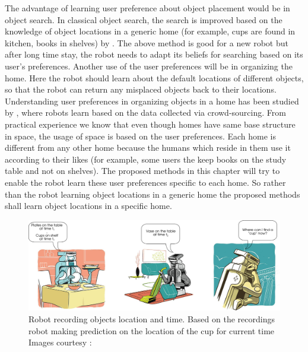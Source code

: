 The advantage of learning user preference about object placement would be in object search. In classical object search, the search is improved based on the knowledge of object locations in a generic home  (for example, cups are found in kitchen, books in shelves) by \cite{samadi_using_2012, joho_learning_2011}. The above method is good for a new robot but after long time stay, the robot needs to adapt its beliefs for searching based on its user's preferences. Another use of the user preferences will be in organizing the home. Here the robot should learn  about the default locations of different objects, so that the robot can return any misplaced objects back to their locations. Understanding user preferences in organizing objects in a home has 
been studied by  \cite{abdo2015robot}, where robots learn based on the data collected via crowd-sourcing.  From practical experience we know that even though homes have same base structure in space, the usage of space is based on the user preferences. Each home is different from any other home because the humans which reside in them use it according to their likes  (for example, some users the keep books on the study table and not on shelves). The proposed methods in this chapter will try to enable the robot learn these user preferences specific to each home. So rather than the robot learning object locations in a generic home the proposed methods shall learn object locations in a specific home.


\begin{figure}[htp]
\centering
\includegraphics[scale=0.4]{pictures/scenario.png}
\caption[Example scenario of robot recording objects location and time]{Robot recording objects location and time. Based on the
recordings robot making prediction on the location of the cup for current time
Images courtesy : \citep{willowgarage} }
\label{scenario}
\end{figure}

